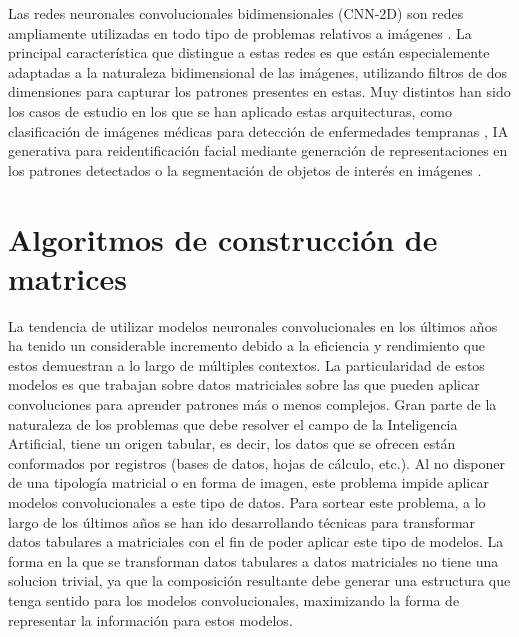 \documentclass{uathesis-es}
\begin{document}
Las redes neuronales convolucionales bidimensionales (CNN-2D) son redes ampliamente utilizadas en todo tipo de problemas relativos a imágenes \cite{9451544}. La principal característica que distingue a estas redes es que están especialemente adaptadas a la naturaleza bidimensional de las imágenes, utilizando filtros de dos dimensiones para capturar los patrones presentes en estas. Muy distintos han sido los casos de estudio en los que se han aplicado estas arquitecturas, como clasificación de imágenes médicas para detección de enfermedades tempranas \cite{7064414}, IA generativa para reidentificación facial \cite{6909616} mediante generación de representaciones en los patrones detectados o la segmentación de objetos de interés en imágenes \cite{long2015fully}.

\section{Algoritmos de construcción de matrices}
\label{SOAT_MATRIX_ALGORITHM_CONSTRUCTION}

La tendencia de utilizar modelos neuronales convolucionales en los últimos años ha tenido un considerable incremento debido a la eficiencia y rendimiento que estos demuestran a lo largo de múltiples contextos. La particularidad de estos modelos es que trabajan sobre datos matriciales sobre las que pueden aplicar convoluciones para aprender patrones más o menos complejos. Gran parte de la naturaleza de los problemas que debe resolver el campo de la Inteligencia Artificial, tiene un origen tabular, es decir, los datos que se ofrecen están conformados por registros (bases de datos, hojas de cálculo, etc.). Al no disponer de una tipología matricial o en forma de imagen, este problema impide aplicar modelos convolucionales a este tipo de datos. Para sortear este problema, a lo largo de los últimos años se han ido desarrollando técnicas para transformar datos tabulares a matriciales con el fin de poder aplicar este tipo de modelos. La forma en la que se transforman datos tabulares a datos matriciales no tiene una solucion trivial, ya que la composición resultante debe generar una estructura que tenga sentido para los modelos convolucionales, maximizando la forma de representar la información para estos modelos. 
\end{document}
